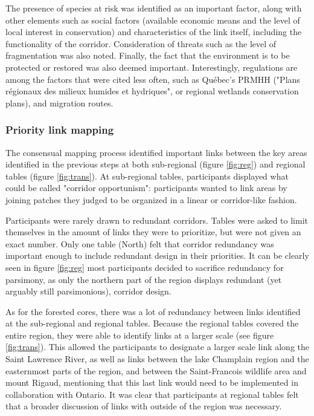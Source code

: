 The presence of species at risk was identified as an important factor, along with other elements such as social factors (available economic means and the level of local interest in conservation) and characteristics of the link itself, including the functionality of the corridor. Consideration of threats such as the level of fragmentation was also noted. Finally, the fact that the environment is to be protected or restored was also deemed important. Interestingly, regulations are among the factors that were cited less often, such as Québec's PRMHH ("Plans régionaux des milieux humides et hydriques", or regional wetlands conservation plans), and migration routes. \\

\subsubsection*{Priority link mapping}

The consensual mapping process identified important links between the key areas identified in the previous steps at both sub-regional (figure \ref{fig:reg}) and regional tables (figure \ref{fig:trans}). At sub-regional tables, participants displayed what could be called "corridor opportunism": participants wanted to link areas by joining patches they judged to be organized in a linear or corridor-like fashion.

Participants were rarely drawn to redundant corridors. Tables were asked to limit themselves in the amount of links they were to prioritize, but were not given an exact number. Only one table (North) felt that corridor redundancy was important enough to include redundant design in their priorities. It can be clearly seen in figure \ref{fig:reg} most participants decided to sacrifice redundancy for parsimony, as only the northern part of the region displays redundant (yet arguably still parsimonious), corridor design.

As for the forested cores, there was a lot of redundancy between links identified at the sub-regional and regional tables. Because the regional tables covered the entire region, they were able to identify links at a larger scale (see figure \ref{fig:trans}). This allowed the participants to designate a larger scale link along the Saint Lawrence River, as well as links between the lake Champlain region and the easternmost parts of the region, and between the Saint-Francois wildlife area and mount Rigaud, mentioning that this last link would need to be implemented in collaboration with Ontario. It was clear that participants at regional tables felt that a broader discussion of links with outside of the region was necessary. \\

